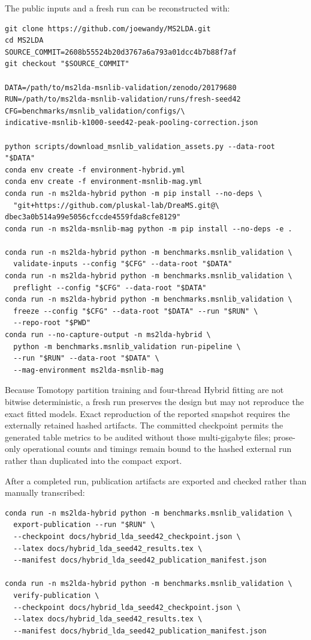\documentclass[11pt]{article}
\begin{document}
The public inputs and a fresh run can be reconstructed with:
{\footnotesize
\begin{verbatim}
git clone https://github.com/joewandy/MS2LDA.git
cd MS2LDA
SOURCE_COMMIT=2608b55524b20d3767a6a793a01dcc4b7b88f7af
git checkout "$SOURCE_COMMIT"

DATA=/path/to/ms2lda-msnlib-validation/zenodo/20179680
RUN=/path/to/ms2lda-msnlib-validation/runs/fresh-seed42
CFG=benchmarks/msnlib_validation/configs/\
indicative-msnlib-k1000-seed42-peak-pooling-correction.json

python scripts/download_msnlib_validation_assets.py --data-root "$DATA"
conda env create -f environment-hybrid.yml
conda env create -f environment-msnlib-mag.yml
conda run -n ms2lda-hybrid python -m pip install --no-deps \
  "git+https://github.com/pluskal-lab/DreaMS.git@\
dbec3a0b514a99e5056cfccde4559fda8cfe8129"
conda run -n ms2lda-msnlib-mag python -m pip install --no-deps -e .

conda run -n ms2lda-hybrid python -m benchmarks.msnlib_validation \
  validate-inputs --config "$CFG" --data-root "$DATA"
conda run -n ms2lda-hybrid python -m benchmarks.msnlib_validation \
  preflight --config "$CFG" --data-root "$DATA"
conda run -n ms2lda-hybrid python -m benchmarks.msnlib_validation \
  freeze --config "$CFG" --data-root "$DATA" --run "$RUN" \
  --repo-root "$PWD"
conda run --no-capture-output -n ms2lda-hybrid \
  python -m benchmarks.msnlib_validation run-pipeline \
  --run "$RUN" --data-root "$DATA" \
  --mag-environment ms2lda-msnlib-mag
\end{verbatim}
}
Because Tomotopy partition training and four-thread Hybrid fitting are not
bitwise deterministic, a fresh run preserves the design but may not reproduce
the exact fitted models. Exact reproduction of the reported snapshot requires
the externally retained hashed artifacts. The committed checkpoint permits the
generated table metrics to be audited without those multi-gigabyte files;
prose-only operational counts and timings remain bound to the hashed external
run rather than duplicated into the compact export.

After a completed run, publication artifacts are exported and checked rather
than manually transcribed:
{\footnotesize
\begin{verbatim}
conda run -n ms2lda-hybrid python -m benchmarks.msnlib_validation \
  export-publication --run "$RUN" \
  --checkpoint docs/hybrid_lda_seed42_checkpoint.json \
  --latex docs/hybrid_lda_seed42_results.tex \
  --manifest docs/hybrid_lda_seed42_publication_manifest.json

conda run -n ms2lda-hybrid python -m benchmarks.msnlib_validation \
  verify-publication \
  --checkpoint docs/hybrid_lda_seed42_checkpoint.json \
  --latex docs/hybrid_lda_seed42_results.tex \
  --manifest docs/hybrid_lda_seed42_publication_manifest.json
\end{verbatim}
}
\end{document}
